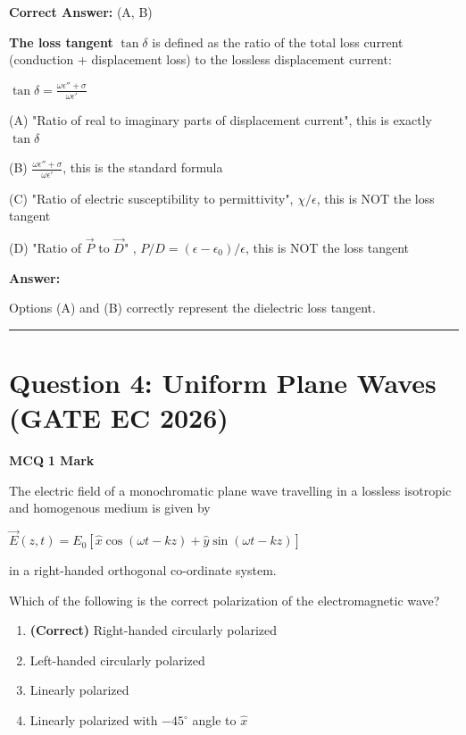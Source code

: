 \documentclass[11pt,a4paper]{article}
\begin{document}
\noindent \textbf{Correct Answer:} (A, B)

\begin{tcolorbox}[solbox, title=Detailed Solution -- Question 3]
\textbf{The loss tangent} $\tan\delta$ is defined as the ratio of the total loss current (conduction + displacement loss) to the lossless displacement current:

$\tan\delta = \frac{\omega\epsilon'' + \sigma}{\omega\epsilon'}$

(A) "Ratio of real to imaginary parts of displacement current", this is exactly $\tan\delta$

(B) $\frac{\omega\epsilon'' + \sigma}{\omega\epsilon'}$, this is the standard formula

(C) "Ratio of electric susceptibility to permittivity", $\chi/\epsilon$, this is NOT the loss tangent

(D) "Ratio of $\vec{P}$ to $\vec{D}$" , $P/D = (\epsilon-\epsilon_0)/\epsilon$, this is NOT the loss tangent

\textbf{Answer:}

Options (A) and (B) correctly represent the dielectric loss tangent.
\end{tcolorbox}

\vspace{1.5em}
\hrule
\vspace{1.5em}

\section*{Question 4: Uniform Plane Waves (GATE EC 2026)}
\noindent \textbf{\color{primary}MCQ} \hfill \textbf{\color{secondary}1 Mark}


\noindent The electric field of a monochromatic plane wave travelling in a lossless isotropic and homogenous medium is given by

 $\vec{E}(z,t) = E_0[\hat{x}\cos(\omega t - kz) + \hat{y}\sin(\omega t - kz)]$

 in a right-handed orthogonal co-ordinate system. 

Which of the following is the correct polarization of the electromagnetic wave?


\begin{enumerate}[label=(\Alph*)]
    \item \textbf{(Correct)} Right-handed circularly polarized
    \item Left-handed circularly polarized
    \item Linearly polarized
    \item Linearly polarized with $-45^\circ$ angle to $\hat{x}$
\end{enumerate}
\end{document}
